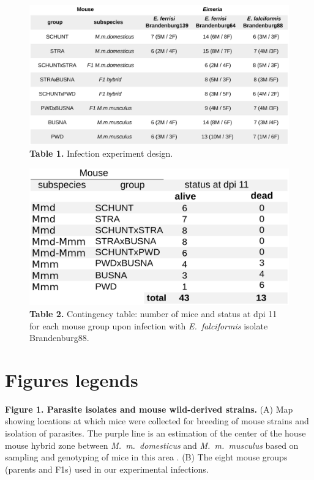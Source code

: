 \documentclass[12pt]{article}
\begin{document}
\begin{figure}[H]
	\centering
	\includegraphics[width=\linewidth,height=\textheight,keepaspectratio]{images/Table1_final.pdf}
	\captionsetup{labelformat=empty}
	\caption{\textbf{Table 1.} Infection experiment design.}
\end{figure}
\addtocounter{figure}{-1}

\begin{figure}[H]
	\centering
	\includegraphics[width=\linewidth,height=\textheight,keepaspectratio]{images/Table2_final.pdf}
	\captionsetup{labelformat=empty}
	\caption{\textbf{Table 2.} Contingency table: number of mice and status at dpi 11 for each mouse group upon infection with \textit{E. falciformis} isolate Brandenburg88.}
\end{figure}
\addtocounter{figure}{-1}

\section*{Figures legends}

\textbf{Figure 1. Parasite isolates and mouse wild-derived strains.} (A) Map showing locations at which mice were collected for breeding of mouse strains and isolation of parasites. The purple line is an estimation of the center of the house mouse hybrid zone between \textit{M.~m.~domesticus} and \textit{M.~m.~musculus} based on sampling and genotyping of mice in this area \citep{Balard2020, dureje_mouse_2012, macholan_widespread_2019}. (B) The eight mouse groups (parents and F1s) used in our experimental infections.
\end{document}
